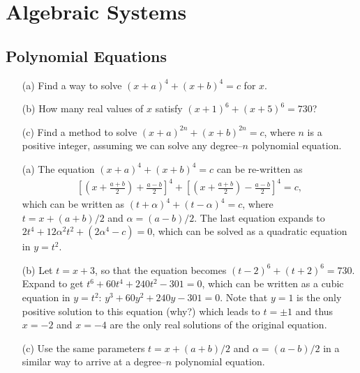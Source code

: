 \section{Algebraic Systems}

\subsection{Polynomial Equations}


\begin{tcolorbox}
\begin{question}
\begin{itemize}
    \item[(a)] Find a way to solve $(x+a)^4+(x+b)^4=c$ for $x$.
    \item[(b)] How many real values of $x$ satisfy $(x+1)^6+(x+5)^6=730$?
    \item[(c)] Find a method to solve $(x+a)^{2n} + (x+b)^{2n}=c$, where $n$ is a positive integer, assuming we can solve any degree--$n$ polynomial equation.
\end{itemize}
\end{question}
\end{tcolorbox}

\begin{solution}[name=Solution by Parviz Shahriari]
\begin{itemize}
    \item[(a)] The equation $(x+a)^4+(x+b)^4=c$ can be re-written as
    \begin{align*}
        \left[\left(x+\frac{a+b}{2}\right) + \frac{a-b}{2}\right]^4 + \left[\left(x+\frac{a+b}{2}\right) - \frac{a-b}{2}\right]^4 =c,
    \end{align*}
    which can be written as $(t + \alpha)^4 + (t - \alpha)^4 = c$, where $t = x + (a+b)/2$ and $\alpha = (a-b)/2$. The last equation expands to $2t^4 + 12\alpha^2t^2 + (2\alpha^4 - c) = 0$, which can be solved as a quadratic equation in $y=t^2$.
    \item[(b)] Let $t=x+3$, so that the equation becomes $(t-2)^6 + (t+2)^6 = 730$. Expand to get $t^6+60t^4+240t^2-301=0$, which can be written as a cubic equation in $y=t^2$: $y^3+60y^2+240y-301=0$. Note that $y=1$ is the only positive solution to this equation (why?) which leads to $t= \pm 1$ and thus $x=-2$ and $x=-4$ are the only real solutions of the original equation.
    \item[(c)] Use the same parameters $t = x + (a+b)/2$ and $\alpha = (a-b)/2$ in a similar way to arrive at a degree--$n$ polynomial equation.
\end{itemize}
\end{solution}


